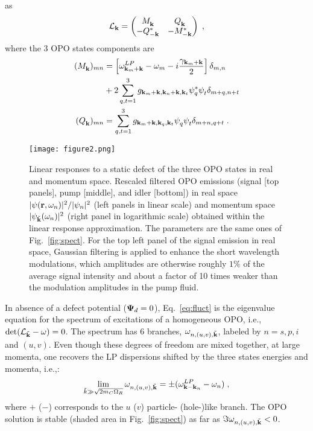 as~\cite{Wouters_2007}
%
\begin{equation}
  \mathcal{L}_{{\mathbf k}} = \begin{pmatrix} M_{{\mathbf k}}^{} & Q_{{\mathbf k}}^{}
    \\ -Q_{-{\mathbf k}}^* & -M_{-{\mathbf k}}^* \end{pmatrix} \; ,
\end{equation}
%
where the 3 OPO states components are
%
\begin{align}
  (M_{\vect{k}}^{})_{mn} &= \left[\omega^{LP}_{\vect{k}_m + \vect{k}}
    - \omega_m - i\Frac{\gamma_{\vect{k}_m + \vect{k}}}{2}\right]
  \delta_{m,n} \\
%
  \nonumber & + 2\sum_{q,t=1}^3
  g_{\vect{k}_m+\vect{k},\vect{k}_n+\vect{k},\vect{k}_t} \psi_q^*
  \psi_t^{} \delta_{m+q,n+t}\\
%
  (Q_{\vect{k}}^{})_{mn} &= \sum_{q,t=1}^3
  g_{\vect{k}_m+\vect{k},\vect{k}_q,\vect{k}_t} \psi_q^{} \psi_t^{}
  \delta_{m+n,q+t}\; .
\end{align}
%


%
\begin{figure}[h!]
\centering
\texttt{[image: figure2.png]}
\caption{Linear responses to a static defect of the three OPO states
  in real and momentum space. Rescaled filtered OPO emissions (signal
  [top panels], pump [middle], and idler [bottom]) in real space
  $|\psi ({\mathbf r},\omega_n)|^2/|\psi_n|^2$ (left panels in linear
  scale) and momentum space $|\psi_{\tilde{{\mathbf k}}} (\omega_n)|^2$
  (right panel in logarithmic scale) obtained within the linear
  response approximation. The parameters are the same ones of
  Fig.~\ref{fig:spect}. For the top left panel of the signal emission
  in real space, Gaussian filtering is applied to enhance the short
  wavelength modulations, which amplitudes are otherwise roughly $1\%$
  of the average signal intensity and about a factor of 10 times
  weaker than the modulation amplitudes in the pump fluid.}
\label{fig:ereal}
\end{figure}
%
In absence of a defect potential (${\boldsymbol\Psi}_d =0$),
Eq.~\eqref{eq:fluct} is the eigenvalue equation for the spectrum of
excitations of a homogeneous OPO, i.e.,
$\det(\mathcal{L}_{\tilde{{\mathbf k}}} - \omega)=0$. The spectrum has 6
branches, $\omega_{n,(u,v),\tilde{{\mathbf k}}}$, labeled by $n=s,p,i$
and $(u,v)$. Even though these degrees of freedom are mixed together,
at large momenta, one recovers the LP dispersions shifted by the three
states energies and momenta, i.e.,:
%
\begin{equation}
  \lim_{\tilde{k} \gg \sqrt{2m_C \Omega_R}} \omega_{n,(u,v),\tilde{{\mathbf k}}} = \pm
  (\omega^{LP}_{{\mathbf k} - {\mathbf k}_n} - \omega_n)\; ,
\label{eq:large}
\end{equation}
%
where $+$ ($-$) corresponds to the $u$ ($v$) particle- (hole-)like
branch.
%
The OPO solution is stable (shaded area in Fig.~\ref{fig:spect}) as
far as $\Im \omega_{n,(u,v),\tilde{{\mathbf k}}} < 0$.

